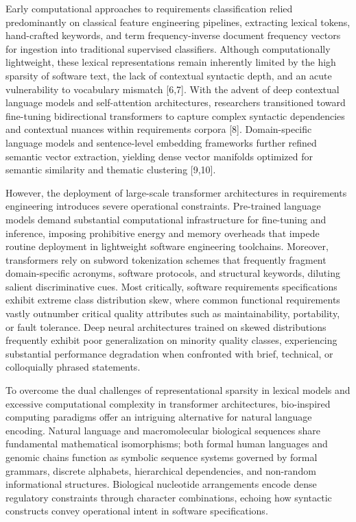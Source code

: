 Early computational approaches to requirements classification relied predominantly on classical feature engineering pipelines, extracting lexical tokens, hand-crafted keywords, and term frequency-inverse document frequency vectors for ingestion into traditional supervised classifiers. Although computationally lightweight, these lexical representations remain inherently limited by the high sparsity of software text, the lack of contextual syntactic depth, and an acute vulnerability to vocabulary mismatch [6,7]. With the advent of deep contextual language models and self-attention architectures, researchers transitioned toward fine-tuning bidirectional transformers to capture complex syntactic dependencies and contextual nuances within requirements corpora [8]. Domain-specific language models and sentence-level embedding frameworks further refined semantic vector extraction, yielding dense vector manifolds optimized for semantic similarity and thematic clustering [9,10].

However, the deployment of large-scale transformer architectures in requirements engineering introduces severe operational constraints. Pre-trained language models demand substantial computational infrastructure for fine-tuning and inference, imposing prohibitive energy and memory overheads that impede routine deployment in lightweight software engineering toolchains. Moreover, transformers rely on subword tokenization schemes that frequently fragment domain-specific acronyms, software protocols, and structural keywords, diluting salient discriminative cues. Most critically, software requirements specifications exhibit extreme class distribution skew, where common functional requirements vastly outnumber critical quality attributes such as maintainability, portability, or fault tolerance. Deep neural architectures trained on skewed distributions frequently exhibit poor generalization on minority quality classes, experiencing substantial performance degradation when confronted with brief, technical, or colloquially phrased statements.

To overcome the dual challenges of representational sparsity in lexical models and excessive computational complexity in transformer architectures, bio-inspired computing paradigms offer an intriguing alternative for natural language encoding. Natural language and macromolecular biological sequences share fundamental mathematical isomorphisms; both formal human languages and genomic chains function as symbolic sequence systems governed by formal grammars, discrete alphabets, hierarchical dependencies, and non-random informational structures. Biological nucleotide arrangements encode dense regulatory constraints through character combinations, echoing how syntactic constructs convey operational intent in software specifications. 

